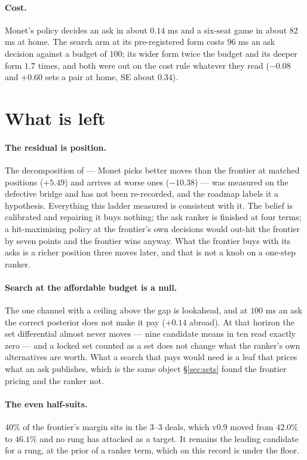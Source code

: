 \documentclass[11pt]{article}
\begin{document}
\paragraph{Cost.} Monet's policy decides an ask in about $0.14$ ms and a six-seat game in about
$82$ ms at home. The search arm at its pre-registered form costs $96$ ms an ask decision against a
budget of $100$; its wider form twice the budget and its deeper form $1.7$ times, and both were out on
the cost rule whatever they read ($-0.08$ and $+0.60$ sets a pair at home, SE about $0.34$).

\section{What is left}
\label{sec:left}

\paragraph{The residual is position.} The decomposition of \cite{frontier} --- Monet picks better
moves than the frontier at matched positions ($+5.49$) and arrives at worse ones ($-10.38$) --- was
measured on the defective bridge and has not been re-recorded, and the roadmap labels it a
hypothesis. Everything this ladder measured is consistent with it. The belief is calibrated and
repairing it buys nothing; the ask ranker is finished at four terms; a hit-maximising policy at the
frontier's own decisions would out-hit the frontier by seven points and the frontier wins anyway.
What the frontier buys with its asks is a richer position three moves later, and that is not a
knob on a one-step ranker.

\paragraph{Search at the affordable budget is a null.} The one channel with a ceiling above the
gap is lookahead, and at $100$ ms an ask the correct posterior does not make it pay ($+0.14$ abroad).
At that horizon the set differential almost never moves --- nine candidate means in ten read exactly
zero --- and a locked set counted as a set does not change what the ranker's own alternatives are
worth. What a search that pays would need is a leaf that prices what an ask publishes, which is the
same object \S\ref{sec:sets} found the frontier pricing and the ranker not.

\paragraph{The even half-suits.} $40\%$ of the frontier's margin sits in the $3$--$3$ deals, which
v0.9 moved from $42.0\%$ to $46.1\%$ and no rung has attacked as a target. It remains the leading
candidate for a rung, at the prior of a ranker term, which on this record is under the floor.
\end{document}
